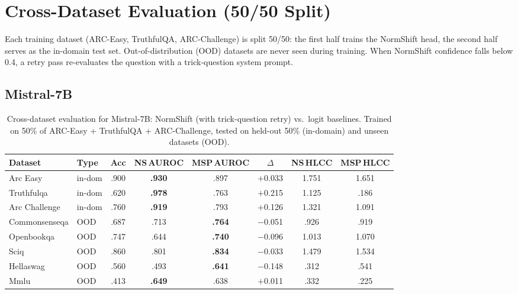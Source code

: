 \documentclass[11pt,a4paper]{article}
\begin{document}
\section{Cross-Dataset Evaluation (50/50 Split)}
\label{app:cross-dataset-eval}

Each training dataset (ARC-Easy, TruthfulQA, ARC-Challenge) is
split 50/50: the first half trains the NormShift head, the second
half serves as the in-domain test set.  Out-of-distribution (OOD)
datasets are never seen during training.  When NormShift confidence
falls below 0.4, a retry pass re-evaluates the question with a
trick-question system prompt.

\subsection{Mistral-7B}

\begin{table}[H]
\centering
\caption{Cross-dataset evaluation for Mistral-7B: NormShift (with trick-question retry) vs.\ logit baselines.
         Trained on 50\% of ARC-Easy + TruthfulQA + ARC-Challenge,
         tested on held-out 50\% (in-domain) and unseen datasets (OOD).}
\label{tab:cross-dataset-mistral-7b}
\small
\begin{tabular}{@{}llcccccc@{}}
\toprule
Dataset & Type & Acc & NS\,AUROC & MSP\,AUROC & $\Delta$ & NS\,HLCC & MSP\,HLCC \\
\midrule
Arc Easy             & in-dom & .900 & \textbf{.930} & .897 & $+$0.033 & 1.751 & 1.651 \\
Truthfulqa           & in-dom & .620 & \textbf{.978} & .763 & $+$0.215 & 1.125 & .186 \\
Arc Challenge        & in-dom & .760 & \textbf{.919} & .793 & $+$0.126 & 1.321 & 1.091 \\
Commonsenseqa        & OOD & .687 & .713 & \textbf{.764} & $-$0.051 & .926 & .919 \\
Openbookqa           & OOD & .747 & .644 & \textbf{.740} & $-$0.096 & 1.013 & 1.070 \\
Sciq                 & OOD & .860 & .801 & \textbf{.834} & $-$0.033 & 1.479 & 1.534 \\
Hellaswag            & OOD & .560 & .493 & \textbf{.641} & $-$0.148 & .312 & .541 \\
Mmlu                 & OOD & .413 & \textbf{.649} & .638 & $+$0.011 & .332 & .225 \\
\bottomrule
\end{tabular}
\end{table}
\end{document}
